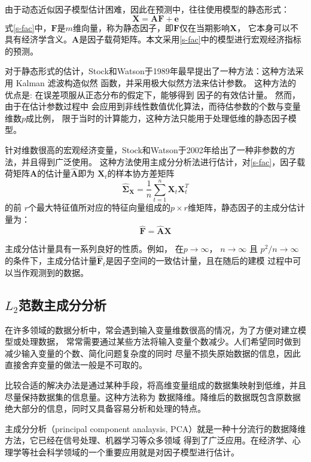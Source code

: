 由于动态近似因子模型估计困难，因此在预测中，往往使用模型的静态形式：
\begin{equation}\label{s-fac}
\bm X = \bm A \bm F + \bm e
\end{equation}
式\eqref{s-fac}中，$\bm F$是$m$维向量，称为静态因子，即$\bm F$仅在当期影响$\bm X$，
它本身可以不具有经济学含义。$\bm A$是因子载荷矩阵。本文采用\eqref{s-fac}中的模型进行宏观经济指标的预测。

对于静态形式的估计，Stock和Watson于1989年最早提出了一种方法\cite{stock1989new}：这种方法采用
Kalman 滤波构造似然 函数，并采用极大似然方法来估计参数。
这种方法的 优点是: 在误差项服从正态分布的假定下，能够得到 因子的有效估计量。
然而，由于在估计参数过程中 会应用到非线性数值优化算法，而待估参数的个数与变量维数$p$成比例，
限于当时的计算能力，这种方法只能用于处理低维的静态因子模型。

针对维数很高的宏观经济变量，Stock和Watson于2002年给出了一种非参数的方法\cite{stock2002forecasting}，并且得到广泛使用。
这种方法使用主成分分析法进行估计，对\eqref{s-fac}，因子载荷矩阵$\bm{A}$的估计量$\hat{\bm{A}}$即为
$\bm{X}_t$的样本协方差矩阵
\begin{equation}\label{fac-pro}
\hat{\bm{\Sigma}}_{\bm{X}} = \frac1{n}\sum_{t=1}^n\bm{X}_t\bm{X}_t^T
\end{equation}
的前
$r$个最大特征值所对应的特征向量组成的$p\times r$维矩阵，静态因子的主成分估计量为：
\begin{equation}\label{factor}
\hat{\bm{F}} = \hat{\bm{A}}\bm{X} 
\end{equation}

主成分估计量具有一系列良好的性质。例如， 在$p \rightarrow \infty$， $n \rightarrow \infty$ 且 $p^2 / n \rightarrow \infty$
的条件下，主成分估计量$\hat{\bm{F}}_t$是因子空间的一致估计量，且在随后的建模 过程中可以当作观测到的数据。

\subsection{$L_2$范数主成分分析}
在许多领域的数据分析中，常会遇到输入变量维数很高的情况，为了方便对建立模型或处理数据，
常常需要通过某些方法将输入变量个数减少。人们希望同时做到减少输入变量的个数、简化问题复杂度的同时
尽量不损失原始数据的信息，因此直接舍弃变量的做法一般是不可取的。

比较合适的解决办法是通过某种手段，将高维变量组成的数据集映射到低维，并且尽量保持数据集的信息量。这种方法称为
数据降维。降维后的数据既包含原数据绝大部分的信息，同时又具备容易分析和处理的特点。

主成分分析（principal component analaysis, PCA）就是一种十分流行的数据降维方法，它已经在信号处理、机器学习等众多领域
得到了广泛应用。在经济学、心理学等社会科学领域的一个重要应用就是对因子模型进行估计。

